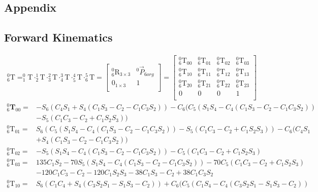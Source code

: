 \documentclass[12pt]{article}
\begin{document}
\begin{CJK}{UTF8}{bsmi}
\section{Appendix}
\subsection{Forward Kinematics}\label{appendix:forward}
\begin{equation*}
\begin{split}
^0_6\text{T} =
^0_1\text{T} \cdot ^1_2\text{T} \cdot ^2_3\text{T} \cdot ^3_4\text{T} \cdot ^4_5\text{T} \cdot ^5_6\text{T} =
\begin{bmatrix}
^0_6\text{R}_{3\times 3} 	&^0\vec{P}_{6org}\\
0_{1\times 3}				&1\\
\end{bmatrix}
=
\begin{bmatrix}
^0_6\text{T}_{00} 	&^0_6\text{T}_{01}	&^0_6\text{T}_{02}	& ^0_6\text{T}_{03}\\
^0_6\text{T}_{10} 	&^0_6\text{T}_{11}	&^0_6\text{T}_{12}	& ^0_6\text{T}_{13}\\
^0_6\text{T}_{20} 	&^0_6\text{T}_{21}	&^0_6\text{T}_{22}	& ^0_6\text{T}_{23}\\
0					&0					&0					&1\\
\end{bmatrix}
\end{split}
\end{equation*}
\begin{equation*}
\begin{split}
^0_6\mathbf{T}_{00} = &- S_6(C_4S_1 + S_4(C_1S_3-C_2 - C_1C_3S_2)) - C_6(C_5(S_1S_4 - C_4(C_1S_3-C_2 - C_1C_3S_2))\\
					& - S_5(C_1C_3-C_2 + C_1S_2S_3))\\
^0_6\text{T}_{01} = &S_6(C_5(S_1S_4 - C_4(C_1S_3-C_2 - C_1C_3S_2)) - S_5(C_1C_3-C_2 + C_1S_2S_3))- C_6(C_4S_1\\
					& + S_4(C_1S_3-C_2 - C_1C_3S_2))\\
^0_6\text{T}_{02} = &- S_5(S_1S_4 - C_4(C_1S_3-C_2 - C_1C_3S_2)) - C_5(C_1C_3-C_2 + C_1S_2S_3)\\
^0_6\text{T}_{03} = &135C_1S_2 - 70S_5(S_1S_4 - C_4(C_1S_3-C_2 - C_1C_3S_2)) - 70C_5(C_1C_3-C_2 + C_1S_2S_3)\\
					& - 120C_1C_3-C_2 - 120C_1S_2S_3 - 38C_1S_3-C_2 + 38C_1C_3S_2\\
^0_6\text{T}_{10} = &S_6(C_1C_4 + S_4(C_3S_2S_1 - S_1S_3-C_2)) + C_6(C_5(C_1S_4 - C_4(C_3S_2S_1 - S_1S_3-C_2))\\

\end{split}
\end{equation*}
\end{CJK}
\end{document}
